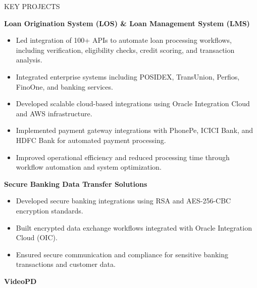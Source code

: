 \documentclass{resume}
\begin{document}
\begin{rSection}{KEY PROJECTS}


\textbf{Loan Origination System (LOS) \& Loan Management System (LMS)}

\begin{itemize}[leftmargin=*]

\item Led integration of 100+ APIs to automate loan processing workflows, including verification, eligibility checks, credit scoring, and transaction analysis.

\item Integrated enterprise systems including POSIDEX, TransUnion, Perfios, FinoOne, and banking services.

\item Developed scalable cloud-based integrations using Oracle Integration Cloud and AWS infrastructure.

\item Implemented payment gateway integrations with PhonePe, ICICI Bank, and HDFC Bank for automated payment processing.

\item Improved operational efficiency and reduced processing time through workflow automation and system optimization.

\end{itemize}


\textbf{Secure Banking Data Transfer Solutions}

\begin{itemize}[leftmargin=*]

\item Developed secure banking integrations using RSA and AES-256-CBC encryption standards.

\item Built encrypted data exchange workflows integrated with Oracle Integration Cloud (OIC).

\item Ensured secure communication and compliance for sensitive banking transactions and customer data.

\end{itemize}


\textbf{VideoPD}


\end{rSection}
\end{document}
